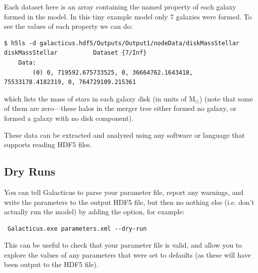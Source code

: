 Each dataset here is an array containing the named property of each galaxy formed in the model. In this tiny example model only 7 galaxies were formed. To see the values of each property we can do:
\begin{verbatim}
$ h5ls -d galacticus.hdf5/Outputs/Output1/nodeData/diskMassStellar
diskMassStellar          Dataset {7/Inf}
    Data:
        (0) 0, 719592.675733525, 0, 36664762.1643418, 75533178.4182319, 0, 764729109.215361
\end{verbatim}
which lists the mass of stars in each galaxy disk (in units of $\mathrm{M}_\odot$) (note that some of them are zero---these halos in the merger tree either formed no galaxy, or formed a galaxy with no disk component).

These data can be extracted and analyzed using any software or language that supports reading HDF5 files.

\subsection{Dry Runs}

You can tell Galacticus to parse your parameter file, report any warnings, and write the parameters to the output HDF5 file, but then no nothing else (i.e. don't actually run the model) by adding the  option, for example:
\begin{verbatim}
 Galacticus.exe parameters.xml --dry-run
\end{verbatim}
This can be useful to check that your parameter file is valid, and allow you to explore the values of any parameters that were set to defaults (as these will have been output to the HDF5 file).
